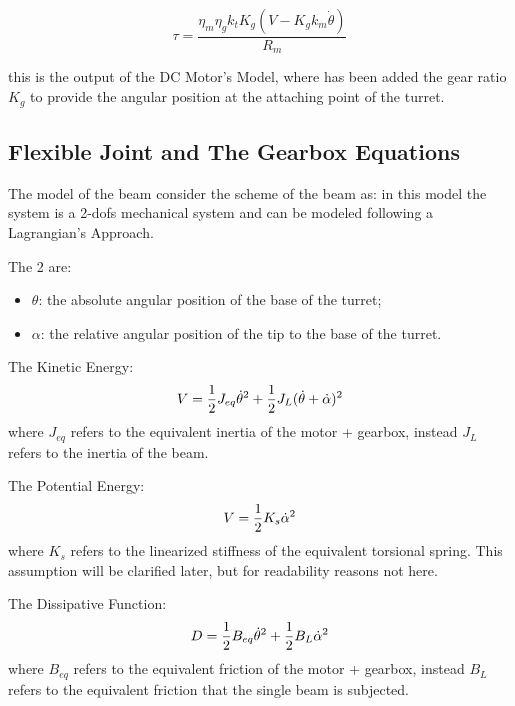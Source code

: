             \[
                \tau = \frac{\eta_m\eta_g k_t K_g(V - K_g k_m\dot\theta)}{R_m} \]
            
            this is the output of the DC Motor's Model, where has been added the gear ratio $K_g$ to provide the angular position at the attaching point of the turret.

        \subsection{Flexible Joint and The Gearbox Equations}

            The model of the beam consider the scheme of the beam as:
            in this model the system is a 2-dofs mechanical system and can be modeled following a Lagrangian's Approach.

            The 2 \dofs are:
            \begin{itemize}
                \item $\theta$: the absolute angular position of the base of the turret;
                \item $\alpha$: the relative angular position of the tip \wrt to the base of the turret.
            \end{itemize}

            The Kinetic Energy:
            \[
                V = \frac{1}{2} J_{eq} \dot{\theta} ^2 + \frac{1}{2} J_{L} (\dot{\theta} + \dot{\alpha}) ^2 \]
            where $J_{eq}$ refers to the equivalent inertia of the motor + gearbox, instead $J_{L}$ refers to the inertia of the beam.

            The Potential Energy:
            \[
                V = \frac{1}{2} K_s \dot{\alpha}^2\]
            where $K_s$ refers to the linearized stiffness of the equivalent torsional spring. This assumption will be clarified later, but for readability reasons not here.
            
            The Dissipative Function:
            \[
                D = \frac{1}{2} B_{eq} \dot{\theta}^2 + \frac{1}{2} B_{L} \dot{\alpha}^2\]
            where $B_{eq}$ refers to the equivalent friction of the motor + gearbox, instead $B_L$ refers to the equivalent friction that the single beam is subjected.
            
